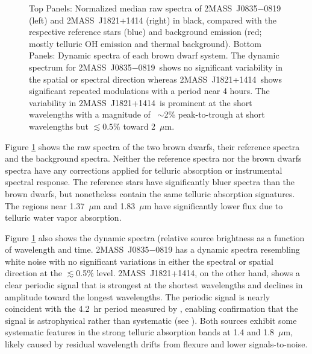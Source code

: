 \documentclass[twocolumn]{aastex6}
\newcommand{\sha}{2MASS~J0835$-$0819}
\newcommand{\shb}{2MASS~J1821+1414}
\begin{document}
\begin{figure}[!t]
{	}
	\caption{Top Panels: Normalized median raw spectra of {\sha} (left) and {\shb} (right) in black, compared with the respective reference stars (blue) and background emission (red; mostly telluric OH emission and thermal background).  Bottom Panels: Dynamic spectra of each brown dwarf system. The dynamic spectrum for \sha\ shows no significant variability in the spatial or spectral direction whereas \shb\ shows significant repeated modulations with a period near 4 hours.
The variability in \shb\ is prominent at the short wavelengths with a magnitude of ~$\sim$2\% peak-to-trough at short wavelengths but $\lesssim 0.5\%$ toward 2~$\mu$m.}
	\label{fig:specphot}
	\vspace{0.1in}
\end{figure} 

Figure \ref{fig:specphot} shows the raw spectra of the two brown dwarfs, their reference spectra and the background spectra.
Neither the reference spectra nor the brown dwarfs spectra have any corrections applied for telluric absorption or instrumental spectral response.
The reference stars have significantly bluer spectra than the brown dwarfs, but nonetheless contain the same telluric absorption signatures.
The regions near 1.37~$\mu$m and 1.83~$\mu$m have significantly lower flux due to telluric water vapor absorption.

Figure \ref{fig:specphot} also shows the dynamic spectra (relative source brightness as a function of wavelength and time.
{\sha} has a dynamic spectra resembling white noise with no significant variations in either the spectral or spatial direction at the $\lesssim$0.5\% level.
{\shb}, on the other hand, shows a clear periodic signal that is strongest at the shortest wavelengths and declines in amplitude toward the longest wavelengths. The periodic signal is nearly coincident with the 4.2~hr period measured by \citet{2015ApJ...799..154M}, enabling confirmation that the signal is astrophysical rather than systematic (see \citealt{2016ApJ...826..156S}).
Both sources exhibit some systematic features in the strong telluric absorption bands at 1.4 and 1.8~$\mu$m, likely caused by residual wavelength drifts from flexure and lower signals-to-noise.
\end{document}
